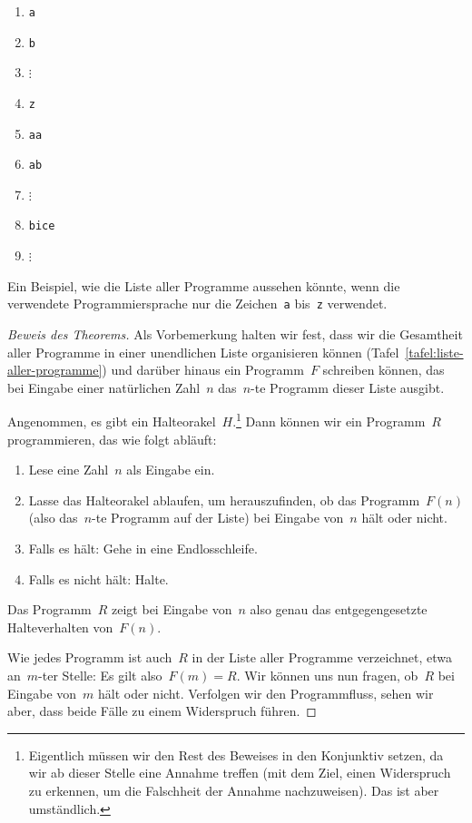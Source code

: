 \documentclass[twoside]{../zirkelblatt1415}
\theoremstyle{definition}
\theoremstyle{plain}
\theoremstyle{remark}
\newenvironment{listing}{
  \renewcommand*\theenumi{\arabic{enumi}}
  \renewcommand{\labelenumi}{\theenumi.}
  \begin{enumerate}\itemsep0em}{\end{enumerate}}
\begin{document}
\begin{table}[t]
  \begin{enumerate}
    \item[1.] \texttt{a} \\[-2.0em]
    \item[2.] \texttt{b} \\[-2.0em]
    \item[] $\vdots$ \\[-2.0em]
    \item[26.] \texttt{z} \\[-2.0em]
    \item[27.] \texttt{aa} \\[-2.0em]
    \item[28.] \texttt{ab} \\[-2.0em]
    \item[] $\vdots$ \\[-2.0em]
    \item[41320.] \texttt{bice} \\[-2.0em]
    \item[] $\vdots$
  \end{enumerate}
  \centering
  \caption{\label{tafel:liste-aller-programme}Ein Beispiel, wie die Liste aller
  Programme aussehen könnte, wenn die verwendete Programmiersprache nur die
  Zeichen~\texttt{a} bis~\texttt{z} verwendet.}
\end{table}

\begin{proof}[Beweis des Theorems]
Als Vorbemerkung halten wir fest, dass wir
die Gesamtheit aller Programme in einer unendlichen Liste organisieren können
(Tafel~\ref{tafel:liste-aller-programme}) und darüber hinaus ein Programm~$F$
schreiben können, das bei Eingabe einer natürlichen Zahl~$n$ das~$n$-te
Programm dieser Liste ausgibt.

Angenommen, es gibt ein Halteorakel~$H$.\footnote{Eigentlich müssen wir den
Rest des Beweises in den Konjunktiv setzen, da wir ab dieser Stelle eine Annahme
treffen (mit dem Ziel, einen Widerspruch zu erkennen, um die Falschheit
der Annahme nachzuweisen). Das ist aber umständlich.}
Dann können wir ein Programm~$R$
programmieren, das wie folgt abläuft:
\begin{listing}
\item Lese eine Zahl~$n$ als Eingabe ein.
\item Lasse das Halteorakel ablaufen, um herauszufinden, ob das
Programm~$F(n)$ (also das~$n$-te Programm auf der Liste) bei Eingabe von~$n$
hält oder nicht.
\item Falls es hält: Gehe in eine Endlosschleife.
\item Falls es nicht hält: Halte.
\end{listing}
Das Programm~$R$ zeigt bei Eingabe von~$n$ also genau das entgegengesetzte
Halteverhalten von~$F(n)$.

Wie jedes Programm ist auch~$R$ in der Liste aller
Programme verzeichnet, etwa an~$m$-ter Stelle: Es gilt also~$F(m) = R$.
Wir können uns nun fragen, ob~$R$ bei Eingabe von~$m$ hält oder nicht. Verfolgen
wir den Programmfluss, sehen wir aber, dass beide Fälle zu einem Widerspruch
führen.
\end{proof}
\end{document}

